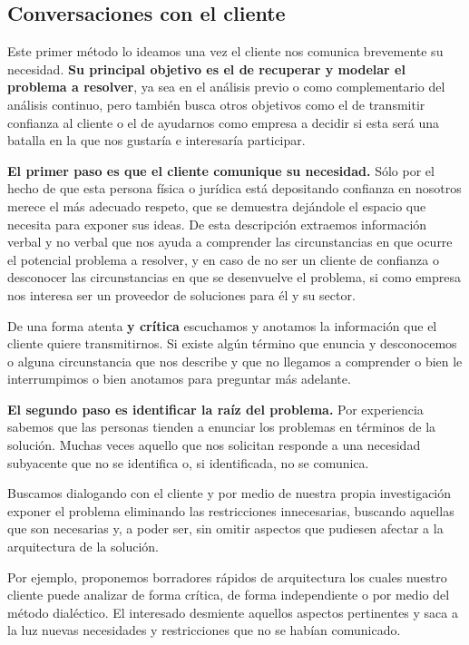 \subsection{Conversaciones con el cliente}

Este primer método lo ideamos una vez el cliente nos comunica brevemente su necesidad.
\textbf{Su principal objetivo es el de recuperar y modelar el problema a resolver}, ya sea en
el análisis previo o como complementario del análisis continuo, pero también busca
otros objetivos como el de transmitir confianza al cliente o el de ayudarnos como empresa a
decidir si esta será una batalla en la que nos gustaría e interesaría participar.

\textbf{El primer paso es que el cliente comunique su necesidad.} Sólo por el hecho de que esta
persona física o jurídica está depositando confianza en nosotros merece el más
adecuado respeto, que se demuestra dejándole el espacio que necesita para exponer
sus ideas. De esta descripción extraemos información verbal y
no verbal que nos ayuda a comprender las circunstancias en que ocurre el potencial
problema a resolver, y en caso de no ser un cliente de confianza o desconocer las
circunstancias en que se desenvuelve el problema, si como empresa nos interesa
ser un proveedor de soluciones para él y su sector.

De una forma atenta \textbf{y crítica} escuchamos y anotamos la información que el
cliente quiere transmitirnos. Si existe algún término que enuncia y desconocemos
o alguna circunstancia que nos describe y que no llegamos a comprender o bien le
interrumpimos o bien anotamos para preguntar más adelante.

\textbf{El segundo paso es identificar la raíz del problema.} Por experiencia sabemos
que las personas tienden a enunciar los problemas en términos de la solución.
Muchas veces aquello que nos solicitan responde a una necesidad subyacente que no
se identifica o, si identificada, no se comunica.

Buscamos dialogando con el cliente y por medio de nuestra propia investigación exponer
el problema eliminando las restricciones innecesarias, buscando aquellas que son
necesarias y, a poder ser, sin omitir aspectos que pudiesen afectar a la arquitectura
de la solución.

Por ejemplo, proponemos borradores rápidos de arquitectura los cuales
nuestro cliente puede analizar de forma crítica, de forma independiente
o por medio del método dialéctico. El interesado desmiente aquellos aspectos
pertinentes y saca a la luz nuevas necesidades y restricciones que no se habían
comunicado.

